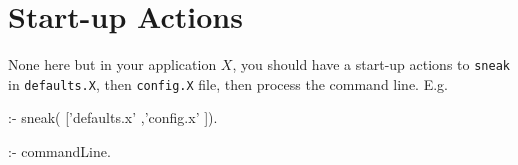 \section{Start-up Actions
}
 None here but in your application $X$,
	you should have a start-up actions
    to {\tt sneak} in {\tt defaults.X}, then
{\tt config.X} file, then process the command line.
E.g.
\begin{LISTING}
:- sneak(
        ['defaults.x' %
        ,'config.x'   %
        ]).

:- commandLine.
\end{LISTING}

